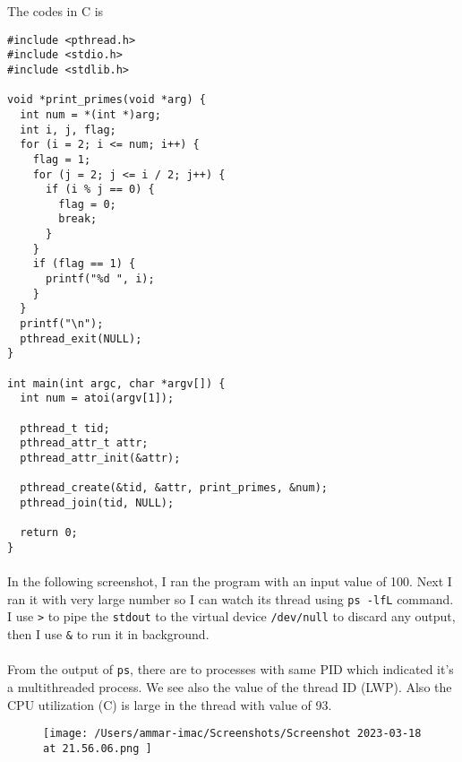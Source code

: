 \documentclass{article}
\def\c#1{\texttt{#1}}
\begin{document}
The codes in C is
\begin{lstlisting}[style=cstyle]
#include <pthread.h>
#include <stdio.h>
#include <stdlib.h>

void *print_primes(void *arg) {
  int num = *(int *)arg;
  int i, j, flag;
  for (i = 2; i <= num; i++) {
    flag = 1;
    for (j = 2; j <= i / 2; j++) {
      if (i % j == 0) {
        flag = 0;
        break;
      }
    }
    if (flag == 1) {
      printf("%d ", i);
    }
  }
  printf("\n");
  pthread_exit(NULL);
}

int main(int argc, char *argv[]) {
  int num = atoi(argv[1]);

  pthread_t tid;
  pthread_attr_t attr;
  pthread_attr_init(&attr);

  pthread_create(&tid, &attr, print_primes, &num);
  pthread_join(tid, NULL);

  return 0;
}
\end{lstlisting}


\newpage
\paragraph{}
In the following screenshot, I ran the program with an input value of 100. Next I ran it with very large
number so I can watch its thread using \c{ps -lfL} command. I use \c{>} to pipe the \c{stdout} to
the virtual device \c{/dev/null} to discard any output, then I use \c{\&} to run it in background.

\paragraph{}
From the output of \c{ps}, there are to processes with same PID which indicated it's a multithreaded
process. We see also the value of the thread ID (LWP). Also the CPU utilization (C) is large in the thread
with value of 93.
\begin{figure}[ht]
	\centering
	\texttt{[image: /Users/ammar-imac/Screenshots/Screenshot 2023-03-18 at 21.56.06.png ]}
\end{figure}
\end{document}
